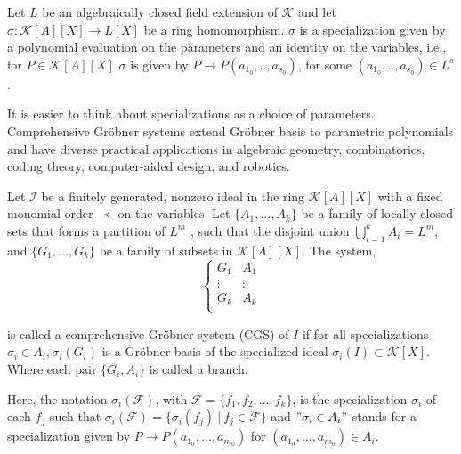 \documentclass[runningheads]{llncs}
\newcommand{\1}{\chi}
\newcommand{\Ff}{\mathcal{F}}
\newcommand{\Ii}{\mathcal{I}}
\begin{document}
\begin{definition}
    Let $L$ be an algebraically closed field extension of $\mathcal{K}$ and let $\sigma:\mathcal{K}[A][X]\rightarrow L[X]$ be a ring homomorphism. $\sigma$ is a specialization given by a polynomial evaluation on the parameters and an identity on the variables, i.e., 
    for $P\in \mathcal{K}[A][X]$
    $\sigma$ is given by $P\rightarrow P(a_{1_0},..,a_{s_0})$, for some $(a_{1_0},..,a_{s_0})\in L^s$.
    
\end{definition}
It is easier to think about specializations as a choice of parameters. \\

Comprehensive Gr{\"o}bner systems extend Gr{\"o}bner basis to 
parametric polynomials and have diverse practical applications in 
algebraic geometry, combinatorics, coding theory, computer-aided design, and robotics.
\begin{definition}
    Let $\Ii$ be a finitely generated, nonzero ideal in the ring $\mathcal{K}[A][X]$ with a fixed monomial order $\prec$ on the variables. 
    Let $\{A_1,\dots,A_k\}$ be a family of locally closed sets that forms a partition of $L^m$ 
    , such that the disjoint union $\bigcup\limits_{i=1}^k A_i=L^m$, and $\{G_1,\dots,G_k\}$ 
    be a family of subsets in $\mathcal{K}[A][X]$.
    The system, 
	\begin{equation}\label{CGS}
	\left\{
		\begin{array}{ll}
			G_1 & A_1 \\
			\vdots  & \vdots \\ 
			G_k & A_k \\
		\end{array}
		\right. 
	\end{equation}

    is called a comprehensive Gr{\"o}bner system (CGS) of $I$
     if for all specializations $\sigma_i \in A_i, \sigma_i (G_i)$ 
     is a Gr{\"o}bner basis of the specialized ideal $\sigma_i (I)\subset \mathcal{K}[X]$.
     Where each pair $\{G_i,A_i\}$ is called a branch. 
\end{definition}
Here, the notation $\sigma_i (\Ff)$, with $\Ff=\{f_1,f_2,\dots ,f_k\}$, is the specialization $\sigma_i$
of each $f_j$ such that  $\sigma_i (\Ff)=\{\sigma_i(f_j)~|~ f_j\in \Ff\}$
and  $"\sigma_i \in A_i"$ stands for a specialization given by $P\rightarrow P(a_{1_0},\dots,a_{m_0})$ 
for $(a_{1_0},\dots,a_{m_0})\in A_i$.\\
\end{document}
